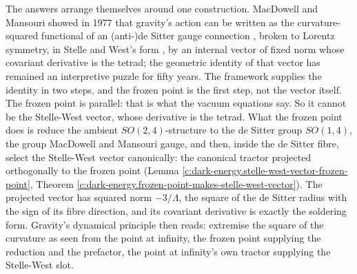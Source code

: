 \documentclass[11pt]{article}
\theoremstyle{definition}
\theoremstyle{plain}
\begin{document}
The answers arrange themselves around one construction. MacDowell and Mansouri showed in 1977 that gravity's action can be written as the curvature-squared functional of an (anti-)de Sitter gauge connection \cite{MacDowellMansouri1977}, broken to Lorentz symmetry, in Stelle and West's form \cite{StelleWest1980}, by an internal vector of fixed norm whose covariant derivative is the tetrad; the geometric identity of that vector has remained an interpretive puzzle for fifty years. The framework supplies the identity in two steps, and the frozen point is the first step, not the vector itself. The frozen point is parallel: that is what the vacuum equations say. So it cannot be the Stelle-West vector, whose derivative is the tetrad. What the frozen point does is reduce the ambient $SO(2,4)$-structure to the de Sitter group $SO(1,4)$, the group MacDowell and Mansouri gauge, and then, inside the de Sitter fibre, select the Stelle-West vector canonically: the canonical tractor projected orthogonally to the frozen point (Lemma \ref{c:dark-energy.stelle-west-vector-frozen-point}, Theorem \ref{c:dark-energy.frozen-point-makes-stelle-west-vector}). The projected vector has squared norm $-3/\Lambda$, the square of the de Sitter radius with the sign of its fibre direction, and its covariant derivative is exactly the soldering form. Gravity's dynamical principle then reads: extremise the square of the curvature as seen from the point at infinity, the frozen point supplying the reduction and the prefactor, the point at infinity's own tractor supplying the Stelle-West slot.
\end{document}

